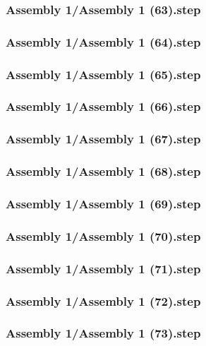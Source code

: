 \documentclass[a4paper,12pt]{article}
\begin{document}
\subsubsection{Assembly 1/Assembly 1 (63).step}

\subsubsection{Assembly 1/Assembly 1 (64).step}

\subsubsection{Assembly 1/Assembly 1 (65).step}

\subsubsection{Assembly 1/Assembly 1 (66).step}

\subsubsection{Assembly 1/Assembly 1 (67).step}

\subsubsection{Assembly 1/Assembly 1 (68).step}

\subsubsection{Assembly 1/Assembly 1 (69).step}

\subsubsection{Assembly 1/Assembly 1 (70).step}

\subsubsection{Assembly 1/Assembly 1 (71).step}

\subsubsection{Assembly 1/Assembly 1 (72).step}

\subsubsection{Assembly 1/Assembly 1 (73).step}

\end{document}
